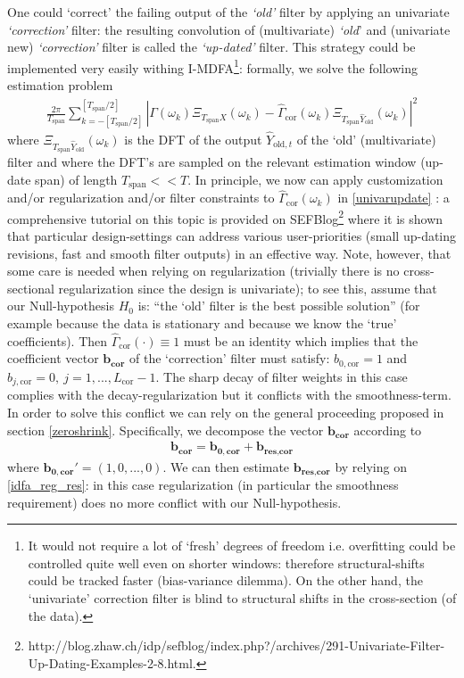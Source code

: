 \documentclass[11pt]{article}
\begin{document}
One could `correct' the failing output of the \emph{`old'} filter by applying  an {univariate} \emph{`correction'} filter: the resulting convolution of (multivariate) \emph{`old}' and (univariate new) \emph{`correction'} filter is called the \emph{`up-dated'} filter. This strategy could be implemented very easily withing I-MDFA\footnote{It would not require a lot of `fresh' degrees of freedom i.e. overfitting could be controlled quite well even on shorter windows: therefore structural-shifts could be tracked faster (bias-variance dilemma). On the other hand, the `univariate' correction filter is blind to structural shifts in the cross-section (of the data).}: formally, we solve the following estimation problem 
\begin{eqnarray}\label{univarupdate}
\frac{2\pi}{T_{\textrm{span}}} \sum_{k=-[T_{\textrm{span}}/2]}^{[T_{\textrm{span}}/2]}
|\Gamma(\omega_k)\Xi_{T_{\textrm{span}}X}(\omega_k)-\hat{\Gamma}_{\textrm{cor}}(\omega_k)\Xi_{T_{\textrm{span}}\hat{Y}_{\textrm{old}}}(\omega_k)|^2
\end{eqnarray}
where $\Xi_{T_{\textrm{span}}\hat{Y}_{\textrm{old}}}(\omega_k)$ is the DFT of the output $\hat{Y}_{\textrm{old},t}$ of the `old' (multivariate) filter and where the DFT's are sampled on the relevant estimation window (up-date span) of length $T_{\textrm{span}}<<T$. In principle, we now can apply customization and/or regularization and/or filter constraints  to  $\hat{\Gamma}_{\textrm{cor}}(\omega_k)$ in \ref{univarupdate} : a comprehensive tutorial on this topic is provided on SEFBlog\footnote{http://blog.zhaw.ch/idp/sefblog/index.php?/archives/291-Univariate-Filter-Up-Dating-Examples-2-8.html.} where it is shown that particular design-settings can address various user-priorities (small up-dating revisions, fast and smooth filter outputs) in an effective way. Note, however, that some care is needed when relying on regularization (trivially there is no cross-sectional regularization since the design is univariate); to see this, assume that our Null-hypothesis $H_0$ is: ``the `old' filter is the best possible solution'' (for example because the data is stationary and because we know the `true' coefficients). Then $\hat{\Gamma}_{\textrm{cor}}(\cdot)\equiv 1$ must be an identity which implies that the coefficient vector $\mathbf{b_{\textrm{cor}}}$ of the `correction' filter must satisfy: $b_{0,\textrm{cor}}=1$ and $b_{j,\textrm{cor}}=0,~j=1,...,L_{\textrm{cor}}-1$. The sharp decay of filter weights in this case complies with the decay-regularization but it conflicts with the smoothness-term. In order to solve this conflict we can rely on the general proceeding proposed in section \ref{zeroshrink}. Specifically,  we decompose the vector $\mathbf{b_{\textrm{cor}}}$ according to
\begin{eqnarray}\label{unityuni}
\mathbf{b_{\textrm{cor}}}=\mathbf{b_{0,\textrm{cor}}}+\mathbf{b_{\textrm{res,cor}}}
\end{eqnarray} 
where $\mathbf{b_{0,\textrm{cor}}}'=(1,0,...,0)$. We can then estimate $\mathbf{b_{\textrm{res,cor}}}$ by relying on \ref{idfa_reg_res}: in this case regularization (in particular the smoothness requirement) does no more conflict with our Null-hypothesis.\\
\end{document}
